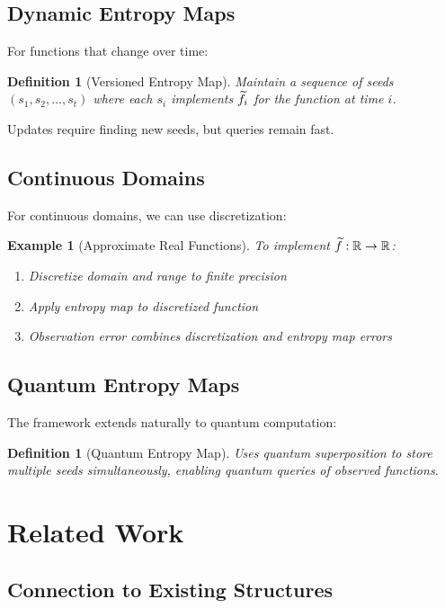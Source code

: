 \documentclass[11pt,final,hidelinks]{article}
\newtheorem{definition}[theorem]{Definition}
\newtheorem{example}[theorem]{Example}
\begin{document}
\subsection{Dynamic Entropy Maps}

For functions that change over time:

\begin{definition}[Versioned Entropy Map]
Maintain a sequence of seeds $(s_1, s_2, \ldots, s_t)$ where each $s_i$ implements $\widetilde{f}_i$ for the function at time $i$.
\end{definition}

Updates require finding new seeds, but queries remain fast.

\subsection{Continuous Domains}

For continuous domains, we can use discretization:

\begin{example}[Approximate Real Functions]
To implement $\widetilde{f}: \mathbb{R} \to \mathbb{R}$:
\begin{enumerate}
    \item Discretize domain and range to finite precision
    \item Apply entropy map to discretized function
    \item Observation error combines discretization and entropy map errors
\end{enumerate}
\end{example}

\subsection{Quantum Entropy Maps}

The framework extends naturally to quantum computation:

\begin{definition}[Quantum Entropy Map]
Uses quantum superposition to store multiple seeds simultaneously, enabling quantum queries of observed functions.
\end{definition}

\section{Related Work}

\subsection{Connection to Existing Structures}
\end{document}
